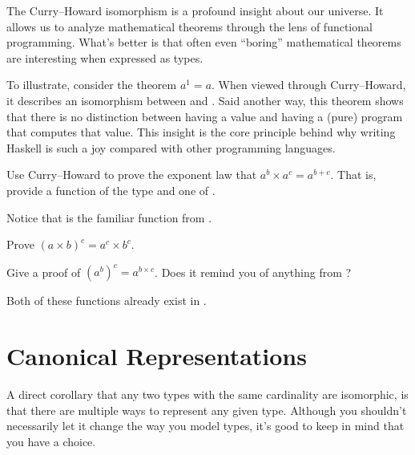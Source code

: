 \documentclass[book.tex]{subfiles}
\begin{document}
The Curry--Howard isomorphism is a profound insight about our universe. It
allows us to analyze mathematical theorems through the lens of functional
programming. What's better is that often even ``boring'' mathematical theorems
are interesting when expressed as types.

To illustrate, consider the theorem $a^1 = a$. When viewed through
Curry--Howard, it describes an isomorphism between  and .
Said another way, this theorem shows that there is no distinction between
having a value and having a (pure) program that computes that value. This
insight is the core principle behind why writing Haskell is such a joy compared
with other programming languages.

\begin{exercise}
Use Curry--Howard to prove the exponent law that $a^b \times a^c =
a^{b+c}$. That is, provide a function of the type  and one of .
\end{exercise}
\begin{solution}

  Notice that  is the familiar  function from .
\end{solution}

\begin{exercise}
Prove $(a\times b)^c = a^c \times b^c$.
\end{exercise}
\begin{solution}
\end{solution}

\begin{exercise}
Give a proof of $(a^b)^c = a^{b\times c}$. Does it remind you of
anything from ?
\end{exercise}
\begin{solution}

  Both of these functions already exist in .
\end{solution}


\section{Canonical Representations}

A direct corollary that any two types with the same cardinality are isomorphic,
is that there are multiple ways to represent any given type. Although you
shouldn't necessarily let it change the way you model types, it's good to keep
in mind that you have a choice.
\end{document}
